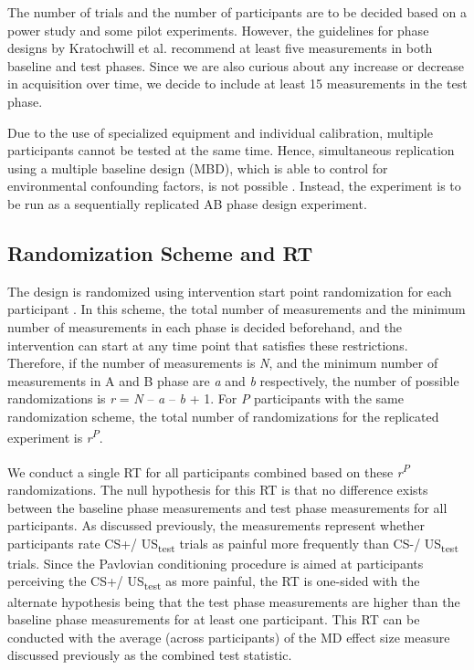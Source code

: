 \documentclass{article}
\begin{document}
The number of trials and the number of participants are to be decided based on a power study and some pilot experiments. However, the guidelines for phase designs by Kratochwill et al. \autocite{bib26} recommend at least five measurements in both baseline and test phases. Since we are also curious about any increase or decrease in acquisition over time, we decide to include at least 15 measurements in the test phase. 

Due to the use of specialized equipment and individual calibration, multiple participants cannot be tested at the same time. Hence, simultaneous replication using a multiple baseline design (MBD), which is able to control for environmental confounding factors, is not possible \autocite{bib9} \autocite{bib10}. Instead, the experiment is to be run as a sequentially replicated AB phase design experiment. 

\subsection{Randomization Scheme and RT} 

The design is randomized using intervention start point randomization for each participant \autocite{bib14}. In this scheme, the total number of measurements and the minimum number of measurements in each phase is decided beforehand, and the intervention can start at any time point that satisfies these restrictions. Therefore, if the number of measurements is \emph{N}, and the minimum number of measurements in A and B phase are \emph{a} and \emph{b} respectively, the number of possible randomizations is \emph{r} = \emph{N} -- \emph{a} -- \emph{b} + 1. For \emph{P} participants with the same randomization scheme, the total number of randomizations for the replicated experiment is \emph{r}\textsuperscript{\emph{P}}. 

We conduct a single RT for all participants combined based on these \emph{r}\textsuperscript{\emph{P}} randomizations. The null hypothesis for this RT is that no difference exists between the baseline phase measurements and test phase measurements for all participants. As discussed previously, the measurements represent whether participants rate CS+/ US\textsubscript{test} trials as painful more frequently than CS-/ US\textsubscript{test} trials. Since the Pavlovian conditioning procedure is aimed at participants perceiving the CS+/ US\textsubscript{test} as more painful, the RT is one-sided with the alternate hypothesis being that the test phase measurements are higher than the baseline phase measurements for at least one participant. This RT can be conducted with the average (across participants) of the MD effect size measure discussed previously as the combined test statistic.
\end{document}
